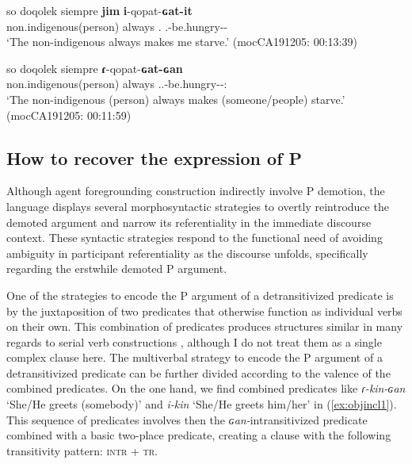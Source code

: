 \documentclass[12pt]{article}
\begin{document}
\begin{exe}
\ex \label{ex:intrhunger}
\begin{xlist}
\ex 
\gll so doqolek siempre{\Sploan} \textbf{jim} \textbf{i}-qopat-\textbf{ɢat-it} \\
{\DetTwo} non.indigenous(person) always {\First\Sg.\Pron} {\Third.\II}-be.hungry-{\Caus}-{\Causee}\\
\trans `The non-indigenous always makes me starve.'
\trans  \hfill (mocCA191205: 00:13:39) \label{ex:intrhungera}
	
\ex 
\gll so doqolek siempre{\Sploan} \textbf{ɾ}-qopat-\textbf{ɢat-ɢan} \\
{\DetTwo} non.indigenous(person) always  {\Third.\Intr.\II}-be.hungry-{\Caus}-{\Vm:\Intr}\\
\trans `The non-indigenous (person) always makes (someone/people) starve.'
\trans  \hfill (mocCA191205: 00:11:59)\label{ex:intrhungerb}
\end{xlist}
\end{exe}

\begin{exe}
\label{ex:intrhungerc}
\end{exe}

\subsection{How to recover the expression of P}
Although agent foregrounding construction indirectly involve P demotion, the language displays several morphosyntactic strategies to overtly reintroduce the demoted argument and narrow its referentiality in the immediate discourse context. These syntactic strategies respond to the functional need of avoiding ambiguity in participant referentiality as the discourse unfolds, specifically regarding the erstwhile demoted P argument.


One of the strategies to encode the P argument of a detransitivized predicate is by the juxtaposition of two predicates that otherwise  function as individual verbs on their own. This combination of predicates produces structures similar in many regards to serial verb constructions \citep[see][]{Aikhenvald2006, Bisang2009, Haspelmath2016}, although I do not treat them as a single complex clause here.  The multiverbal strategy to encode the P argument of a detransitivized predicate can be further divided according to the valence of the combined predicates. On the one hand, we find combined predicates like \textit{ɾ-kin-ɢan} `She/He greets (somebody)' and \textit{i-kin} `She/He greets him/her' in (\ref{ex:objincl1}). This sequence of predicates involves then the \textit{ɢan-}intransitivized predicate combined with a basic two-place predicate, creating a clause with the following transitivity pattern: \textsc{intr} + \textsc{tr}.  
           
\end{document}
